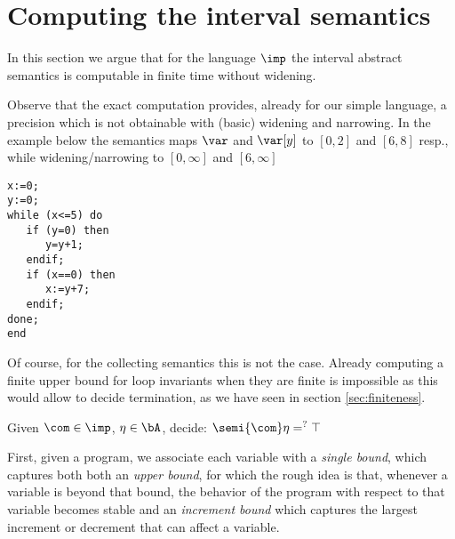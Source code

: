 \section{Computing the interval semantics} 

In this section we argue that for the language \(\imp\) the interval
abstract semantics is computable in finite time without widening.

Observe that the exact computation provides, already for our simple
language, a precision which is not obtainable with (basic) widening
and narrowing. In the example below the semantics maps \(\var\) and
\(\var[y]\) to \([0,2]\) and \([6,8]\) resp., while widening/narrowing
to \([0,\infty]\) and \([6,\infty]\)

\begin{verbatim}
x:=0;
y:=0;
while (x<=5) do
   if (y=0) then
      y=y+1;
   endif;
   if (x==0) then
      x:=y+7;
   endif;
done;
end
\end{verbatim}

Of course, for the collecting semantics this is not the case. Already
computing a finite upper bound for loop invariants when they are
finite is impossible as this would allow to decide termination, as we
have seen in section \ref{sec:finiteness}.

\begin{problem}\label{problem1}
  Given \(\com\in \imp\), \(\eta \in \bA\), decide: \(\semi{\com} \eta
  =^? \top\)
\end{problem}

First, given a program, we associate each variable with a \emph{single
bound}, which captures both both an \emph{upper bound}, for which the
rough idea is that, whenever a variable is beyond that bound, the
behavior of the program with respect to that variable becomes stable
and an \emph{increment bound} which captures the largest increment or
decrement that can affect a variable.

